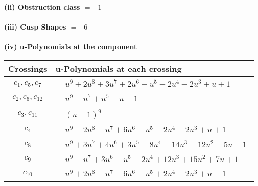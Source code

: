 \documentclass[1p]{elsarticle_modified}
\theoremstyle{definition}
\begin{document}
\flushleft \textbf{(ii) Obstruction class $= -1$}\\~\\
\flushleft \textbf{(iii) Cusp Shapes $= -6$}\\~\\
\newpage\renewcommand{\arraystretch}{1}
\flushleft \textbf{(iv) u-Polynomials at the component}\newline \\
\begin{tabular}{m{50pt}|m{274pt}}
Crossings & \hspace{64pt}u-Polynomials at each crossing \\
\hline $$\begin{aligned}c_{1},c_{5},c_{7}\end{aligned}$$&$\begin{aligned}
&u^9+2 u^8+3 u^7+2 u^6- u^5-2 u^4-2 u^3+u+1
\end{aligned}$\\
\hline $$\begin{aligned}c_{2},c_{6},c_{12}\end{aligned}$$&$\begin{aligned}
&u^9- u^7+u^5- u-1
\end{aligned}$\\
\hline $$\begin{aligned}c_{3},c_{11}\end{aligned}$$&$\begin{aligned}
&(u+1)^9
\end{aligned}$\\
\hline $$\begin{aligned}c_{4}\end{aligned}$$&$\begin{aligned}
&u^9-2 u^8- u^7+6 u^6- u^5-2 u^4-2 u^3+u+1
\end{aligned}$\\
\hline $$\begin{aligned}c_{8}\end{aligned}$$&$\begin{aligned}
&u^9+3 u^7+4 u^6+3 u^5-8 u^4-14 u^3-12 u^2-5 u-1
\end{aligned}$\\
\hline $$\begin{aligned}c_{9}\end{aligned}$$&$\begin{aligned}
&u^9- u^7+3 u^6- u^5-2 u^4+12 u^3+15 u^2+7 u+1
\end{aligned}$\\
\hline $$\begin{aligned}c_{10}\end{aligned}$$&$\begin{aligned}
&u^9+2 u^8- u^7-6 u^6- u^5+2 u^4-2 u^3+u-1
\end{aligned}$\\
\hline
\end{tabular}\\~\\
\end{document}
